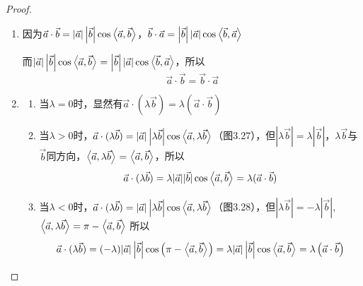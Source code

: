 \begin{proof}
\begin{enumerate}
    \item 因为$\vec{a}\cdot \vec{b}=|\vec{a}|\left|\vec{b}\right|\cos\left\langle \vec{a},\vec{b} \right\rangle$，$\vec{b}\cdot \vec{a}=\left|\vec{b}\right||\vec{a}|\cos\left\langle \vec{b},\vec{a} \right\rangle$

    而$|\vec{a}| \left|\vec{b}\right| \cos \left\langle \vec{a},\vec{b} \right\rangle=\left|\vec{b}\right| |\vec{a}| \cos\left\langle \vec{b},\vec{a} \right\rangle$，所以
\[\vec{a}\cdot \vec{b}=\vec{b}\cdot \vec{a}\]
  \item \begin{enumerate}
      \item 
 当$\lambda =0$时，显然有$\vec{a}\cdot (\lambda \vec{b})=\lambda (\vec{a}\cdot \vec{b})$
  
 \item 当$\lambda >0$时，$\vec{a}\cdot (\lambda \vec{b})=|\vec{a}|\left|\lambda\vec{b}\right|\cos\left\langle \vec{a},\lambda\vec{b} \right\rangle$（图3.27），但$\left|\lambda\vec{b}\right|=\lambda\left|\vec{b}\right|$，$\lambda\vec{b}$与$\vec{b}$同方向，$\left\langle \vec{a},\lambda \vec{b} \right\rangle=\left\langle \vec{a},\vec{b} \right\rangle$，所以
\[\vec{a}\cdot(\lambda\vec{b})=\lambda|\vec{a}||\vec{b}|\cos\left\langle \vec{a},\vec{b} \right\rangle=\lambda(\vec{a}\cdot\vec{b})\]

 \item 当$\lambda<0$时，$\vec{a}\cdot (\lambda \vec{b})=|\vec{a}|\left|\lambda\vec{b}\right|\cos\left\langle \vec{a},\lambda\vec{b} \right\rangle$（图3.28），但$\left|\lambda \vec{b}\right|=-\lambda\left|\vec{b}\right|$, $\left\langle \vec{a},\lambda\vec{b} \right\rangle=\pi-\left\langle \vec{a},\vec{b} \right\rangle$
    所以
\[
    \vec{a}\cdot (\lambda \vec{b})= (-\lambda )|\vec{a}|\left|\vec{b}\right|\cos\left(\pi-\left\langle \vec{a},\vec{b} \right\rangle\right)=\lambda|\vec{a}|\left|\vec{b}\right|\cos \left\langle \vec{a},\vec{b} \right\rangle=\lambda\left(\vec{a}\cdot \vec{b}\right)
\]
\end{enumerate} 

\begin{figure}[htp]\centering
    \begin{minipage}[t]{0.48\textwidth}
    \centering
    \caption{}
    \end{minipage}
    \begin{minipage}[t]{0.48\textwidth}
    \centering
\end{minipage}
\end{figure}
\end{enumerate}
\end{proof}
